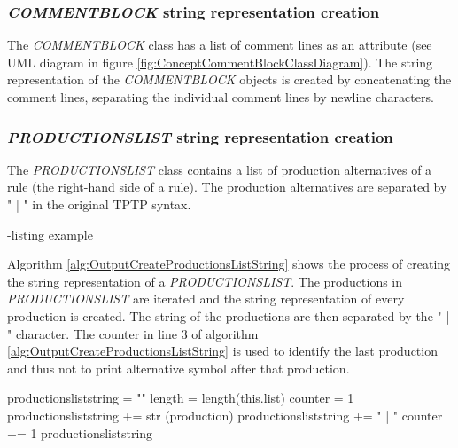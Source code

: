 \subsubsection{\textit{COMMENT\textunderscore BLOCK} string representation creation}

The \textit{COMMENT\textunderscore BLOCK} class has a list of comment lines as an attribute (see UML diagram in figure \ref{fig:ConceptCommentBlockClassDiagram}). The string representation of the \textit{COMMENT\textunderscore BLOCK} objects is created by concatenating the comment lines, separating the individual comment lines by newline characters.

\subsubsection{\textit{PRODUCTIONS\textunderscore LIST} string representation creation}

The \textit{PRODUCTIONS\textunderscore LIST} class contains a list of production alternatives of a rule (the right-hand side of a rule). The production alternatives are separated by " | " in the original \ac{TPTP} syntax.

-listing example

Algorithm \ref{alg:OutputCreateProductionsListString} shows the process of creating the string representation of a \textit{PRODUCTIONS\textunderscore LIST}. The productions in \textit{PRODUCTIONS\textunderscore LIST} are iterated and the string representation of every production is created. The string of the productions are then separated by the " | " character. The counter in line 3 of algorithm \ref{alg:OutputCreateProductionsListString} is used to identify the last production and thus not to print alternative symbol after that production.

\begin{algorithm}[H]
\caption{\textit{PRODUCTIONS\textunderscore LIST} string creation}\label{alg:OutputCreateProductionsListString}
\begin{algorithmic}[1]
\State productions\textunderscore list\textunderscore string = ""
\State length = length(this.list)
\State counter = 1
	\State productions\textunderscore list\textunderscore string += str (production)
		\State productions\textunderscore list\textunderscore string += " | "
	\EndIf
	\State counter += 1
\EndFor
\Return productions\textunderscore list\textunderscore string
\end{algorithmic}
\end{algorithm}

